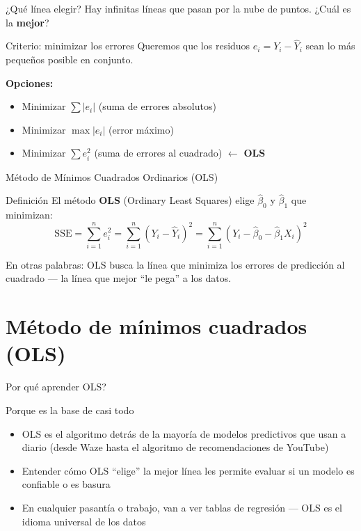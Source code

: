 \documentclass[aspectratio=169, 11pt]{beamer}
\begin{document}
\begin{frame}{¿Qué línea elegir?}
Hay infinitas líneas que pasan por la nube de puntos. ¿Cuál es la \textbf{mejor}?

\vspace{0.2cm}
\begin{block}{Criterio: minimizar los errores}
Queremos que los residuos $e_i = Y_i - \hat{Y}_i$ sean lo más pequeños posible en conjunto.
\end{block}

\vspace{0.2cm}
\textbf{Opciones:}
\begin{itemize}
  \item Minimizar $\sum |e_i|$ (suma de errores absolutos)
  \item Minimizar $\max |e_i|$ (error máximo)
  \item Minimizar $\sum e_i^2$ (suma de errores al cuadrado) $\leftarrow$ \textbf{OLS}
\end{itemize}
\end{frame}

\begin{frame}{M\'etodo de M\'inimos Cuadrados Ordinarios (OLS)}
\begin{alertblock}{Definici\'on}
El m\'etodo \textbf{OLS} (Ordinary Least Squares) elige $\hat{\beta}_0$ y $\hat{\beta}_1$ que minimizan:
\[
\text{SSE} = \sum_{i=1}^{n} e_i^2 = \sum_{i=1}^{n} (Y_i - \hat{Y}_i)^2 = \sum_{i=1}^{n} (Y_i - \hat{\beta}_0 - \hat{\beta}_1 X_i)^2
\]
\end{alertblock}

\vspace{0.3cm}
En otras palabras: OLS busca la l\'inea que minimiza los errores de predicci\'on al cuadrado --- la l\'inea que mejor ``le pega'' a los datos.
\end{frame}

\section{Método de mínimos cuadrados (OLS)}

\begin{frame}{\textquestiondown{}Por qu\'e aprender OLS?}
\begin{exampleblock}{Porque es la base de casi todo}
\small
\begin{itemize}\setlength{\itemsep}{2pt}
  \item OLS es el algoritmo detr\'as de la mayor\'ia de modelos predictivos que usan a diario (desde Waze hasta el algoritmo de recomendaciones de YouTube)
  \item Entender c\'omo OLS ``elige'' la mejor l\'inea les permite evaluar si un modelo es confiable o es basura
  \item En cualquier pasant\'ia o trabajo, van a ver tablas de regresi\'on --- OLS es el idioma universal de los datos
\end{itemize}
\end{exampleblock}
\end{frame}
\end{document}
